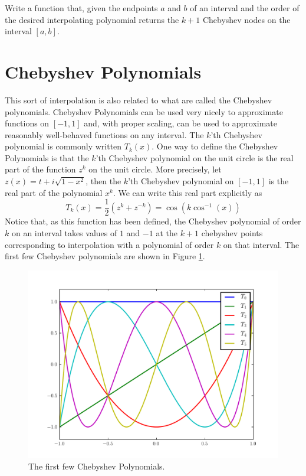 \begin{problem}
Write a function that, given the endpoints $a$ and $b$ of an interval and the order of the desired interpolating polynomial returns the $k+1$ Chebyshev nodes on the interval $[ a, b ]$.
\end{problem}

\section*{Chebyshev Polynomials}
This sort of interpolation is also related to what are called the Chebyshev polynomials.
Chebyshev Polynomials can be used very nicely to approximate functions on $[ -1, 1 ]$ and, with proper scaling, can be used to approximate reasonably well-behaved functions on any interval.
The $k$'th Chebyshev polynomial is commonly written $T_k \left( x \right)$.
One way to define the Chebyshev Polynomials is that the $k$'th Chebyshev polynomial on the unit circle is the real part of the function $z^k$ on the unit circle.
More precisely, let $z(x) = t + i \sqrt{1 - x^2}$, then the $k$'th Chebyshev polynomial on $[-1, 1]$ is the real part of the polynomial $x^k$.
We can write this real part explicitly as
\[T_k \left( x \right) = \frac{1}{2} \left( z^k + z^{-k} \right) = \cos \left( k \cos^{-1} \left( x \right) \right)\]
Notice that, as this function has been defined, the Chebyshev polynomial of order $k$ on an interval takes values of $1$ and $-1$ at the $k+1$ chebyshev points corresponding to interpolation with a polynomial of order $k$ on that interval.
The first few Chebyshev polynomials are shown in Figure \ref{fig:cheb_polys}.

\begin{figure}
\includegraphics[width=\textwidth]{cheb_polys.pdf}
\caption{The first few Chebyshev Polynomials.}
\label{fig:cheb_polys}
\end{figure}

